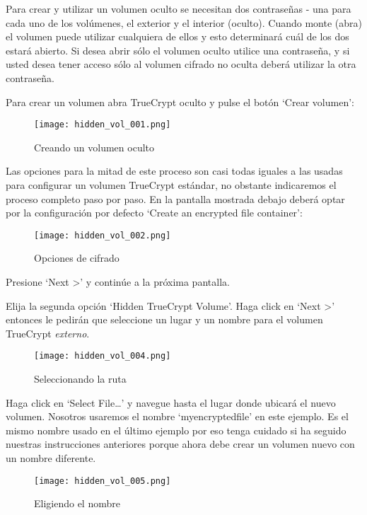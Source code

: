 \documentclass[10pt,a5paper,twoside,,]{book}
\begin{document}
Para crear y utilizar un volumen oculto se necesitan dos contraseñas -
una para cada uno de los volúmenes, el exterior y el interior (oculto).
Cuando monte (abra) el volumen puede utilizar cualquiera de ellos y esto
determinará cuál de los dos estará abierto. Si desea abrir sólo el
volumen oculto utilice una contraseña, y si usted desea tener acceso
sólo al volumen cifrado no oculta deberá utilizar la otra contraseña.

Para crear un volumen abra TrueCrypt oculto y pulse el botón `Crear
volumen':

\begin{figure}[htbp]
\centering
\texttt{[image: hidden\_vol\_001.png]}
\caption{Creando un volumen oculto}
\end{figure}

Las opciones para la mitad de este proceso son casi todas iguales a las
usadas para configurar un volumen TrueCrypt estándar, no obstante
indicaremos el proceso completo paso por paso. En la pantalla mostrada
debajo deberá optar por la configuración por defecto `Create an
encrypted file container':

\begin{figure}[htbp]
\centering
\texttt{[image: hidden\_vol\_002.png]}
\caption{Opciones de cifrado}
\end{figure}

Presione `Next \textgreater{}' y continúe a la próxima pantalla.

Elija la segunda opción `Hidden TrueCrypt Volume'. Haga click en `Next
\textgreater{}' entonces le pedirán que seleccione un lugar y un nombre
para el volumen TrueCrypt \emph{externo}.

\begin{figure}[htbp]
\centering
\texttt{[image: hidden\_vol\_004.png]}
\caption{Seleccionando la ruta}
\end{figure}

Haga click en `Select File\ldots{}' y navegue hasta el lugar donde
ubicará el nuevo volumen. Nosotros usaremos el nombre `myencryptedfile'
en este ejemplo. Es el mismo nombre usado en el último ejemplo por eso
tenga cuidado si ha seguido nuestras instrucciones anteriores porque
ahora debe crear un volumen nuevo con un nombre diferente.

\begin{figure}[htbp]
\centering
\texttt{[image: hidden\_vol\_005.png]}
\caption{Eligiendo el nombre}
\end{figure}
\end{document}

